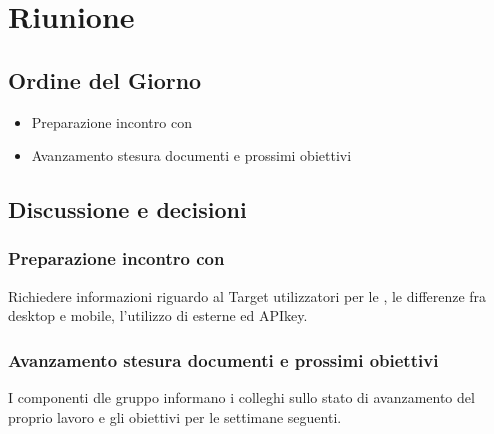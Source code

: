\section{Riunione}
\subsection{Ordine del Giorno}
\begin{itemize}
	\item Preparazione incontro con \Proponente
	\item Avanzamento stesura documenti e prossimi obiettivi
\end{itemize}

\subsection{Discussione e decisioni}
\subsubsection{Preparazione incontro con \Proponente}
Richiedere informazioni riguardo al Target utilizzatori per le , le differenze fra  desktop e mobile, l'utilizzo di  esterne ed APIkey.

\subsubsection{Avanzamento stesura documenti e prossimi obiettivi}
I componenti dle gruppo informano i colleghi sullo stato di avanzamento del proprio lavoro e gli obiettivi per le settimane seguenti.


\clearpage
